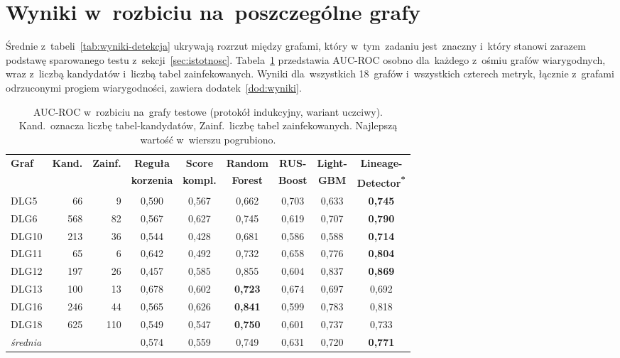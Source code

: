 \documentclass[polish,master,a4paper,oneside]{ppfcmthesis}
\renewcommand{\_}{\origtextunderscore\ifmmode\else\allowbreak\fi}
\begin{document}
\section{Wyniki w~rozbiciu na~poszczególne grafy}
\label{sec:per-graf}

Średnie z~tabeli~\ref{tab:wyniki-detekcja} ukrywają rozrzut między grafami,
który w~tym~zadaniu jest~znaczny i~który stanowi zarazem podstawę sparowanego
testu z~sekcji~\ref{sec:istotnosc}. Tabela~\ref{tab:per-graf} przedstawia AUC-ROC
osobno dla~każdego z~ośmiu grafów wiarygodnych, wraz z~liczbą kandydatów
i~liczbą tabel zainfekowanych. Wyniki dla~wszystkich 18~grafów i~wszystkich
czterech metryk, łącznie z~grafami odrzuconymi progiem wiarygodności, zawiera
dodatek~\ref{dod:wyniki}.

\begin{table}[ht]
\centering
\caption[AUC-ROC w~rozbiciu na~grafy testowe]{AUC-ROC w~rozbiciu na~grafy testowe (protokół indukcyjny, wariant
uczciwy). Kand.\ oznacza liczbę tabel-kandydatów, Zainf.\ liczbę tabel
zainfekowanych.
Najlepszą wartość w~wierszu pogrubiono.}
\label{tab:per-graf}
\small
\begin{tabular}{lrrcccccc}
\toprule
\textbf{Graf} & \textbf{Kand.} & \textbf{Zainf.} & \textbf{Reguła} & \textbf{Score} &
\textbf{Random} & \textbf{RUS-} & \textbf{Light-} & \textbf{Lineage-} \\
 & & & \textbf{korzenia} & \textbf{kompl.} & \textbf{Forest} & \textbf{Boost} &
\textbf{GBM} & \textbf{Detector\textsuperscript{*}} \\
\midrule
DLG5  &  66 &   9 & 0{,}590 & 0{,}567 & 0{,}662 & 0{,}703 & 0{,}633 & \textbf{0{,}745} \\
DLG6  & 568 &  82 & 0{,}567 & 0{,}627 & 0{,}745 & 0{,}619 & 0{,}707 & \textbf{0{,}790} \\
DLG10 & 213 &  36 & 0{,}544 & 0{,}428 & 0{,}681 & 0{,}586 & 0{,}588 & \textbf{0{,}714} \\
DLG11 &  65 &   6 & 0{,}642 & 0{,}492 & 0{,}732 & 0{,}658 & 0{,}776 & \textbf{0{,}804} \\
DLG12 & 197 &  26 & 0{,}457 & 0{,}585 & 0{,}855 & 0{,}604 & 0{,}837 & \textbf{0{,}869} \\
DLG13 & 100 &  13 & 0{,}678 & 0{,}602 & \textbf{0{,}723} & 0{,}674 & 0{,}697 & 0{,}692 \\
DLG16 & 246 &  44 & 0{,}565 & 0{,}626 & \textbf{0{,}841} & 0{,}599 & 0{,}783 & 0{,}818 \\
DLG18 & 625 & 110 & 0{,}549 & 0{,}547 & \textbf{0{,}750} & 0{,}601 & 0{,}737 & 0{,}733 \\
\midrule
\emph{średnia} & & & 0{,}574 & 0{,}559 & 0{,}749 & 0{,}631 & 0{,}720 & \textbf{0{,}771} \\
\bottomrule
\end{tabular}
\end{table}
\end{document}
